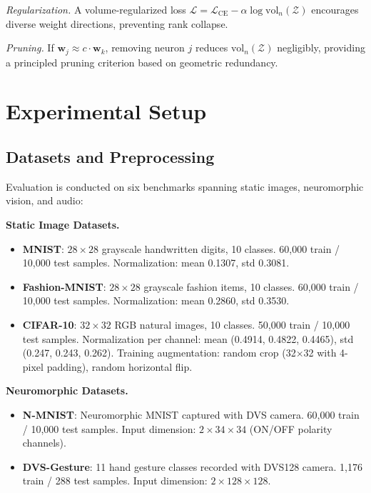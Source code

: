 \documentclass{article}
\theoremstyle{plain}
\theoremstyle{definition}
\theoremstyle{remark}
\begin{document}
\textit{Regularization.} A volume-regularized loss $\mathcal{L} = \mathcal{L}_{\text{CE}} - \alpha \log \mathrm{vol}_n(\mathcal{Z})$ encourages diverse weight directions, preventing rank collapse.

\textit{Pruning.} If $\mathbf{w}_j \approx c \cdot \mathbf{w}_k$, removing neuron $j$ reduces $\mathrm{vol}_n(\mathcal{Z})$ negligibly, providing a principled pruning criterion based on geometric redundancy.

\section{Experimental Setup}
\label{app:setup}

\subsection{Datasets and Preprocessing}

Evaluation is conducted on six benchmarks spanning static images, neuromorphic vision, and audio:

\textbf{Static Image Datasets.}
\begin{itemize}
    \item \textbf{MNIST}: $28{\times}28$ grayscale handwritten digits, 10 classes. 60,000 train / 10,000 test samples. Normalization: mean 0.1307, std 0.3081.
    \item \textbf{Fashion-MNIST}: $28{\times}28$ grayscale fashion items, 10 classes. 60,000 train / 10,000 test samples. Normalization: mean 0.2860, std 0.3530.
    \item \textbf{CIFAR-10}: $32{\times}32$ RGB natural images, 10 classes. 50,000 train / 10,000 test samples. Normalization per channel: mean (0.4914, 0.4822, 0.4465), std (0.247, 0.243, 0.262). Training augmentation: random crop (32$\times$32 with 4-pixel padding), random horizontal flip.
\end{itemize}

\textbf{Neuromorphic Datasets.}
\begin{itemize}
    \item \textbf{N-MNIST}: Neuromorphic MNIST captured with DVS camera. 60,000 train / 10,000 test samples. Input dimension: $2{\times}34{\times}34$ (ON/OFF polarity channels).
    \item \textbf{DVS-Gesture}: 11 hand gesture classes recorded with DVS128 camera. 1,176 train / 288 test samples. Input dimension: $2{\times}128{\times}128$.
\end{itemize}
\end{document}
